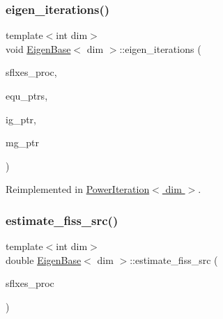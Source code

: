 \mbox{\label{class_eigen_base_ae09830ed4bcb14b7b699cd5f5460fab7}} 
\subsubsection{\texorpdfstring{eigen\+\_\+iterations()}{eigen\_iterations()}}
{\footnotesize\ttfamily template$<$int dim$>$ \\
void \hyperlink{class_eigen_base}{Eigen\+Base}$<$ dim $>$\+::eigen\+\_\+iterations (\begin{DoxyParamCaption}\item[{std\+::vector$<$ Vector$<$ double $>$ $>$ \&}]{sflxes\+\_\+proc,  }\item[{std\+::vector$<$ std\+\_\+cxx11\+::shared\+\_\+ptr$<$ \hyperlink{class_equation_base}{Equation\+Base}$<$ dim $>$ $>$ $>$ \&}]{equ\+\_\+ptrs,  }\item[{std\+\_\+cxx11\+::shared\+\_\+ptr$<$ \hyperlink{class_i_g_base}{I\+G\+Base}$<$ dim $>$ $>$}]{ig\+\_\+ptr,  }\item[{std\+\_\+cxx11\+::shared\+\_\+ptr$<$ \hyperlink{class_m_g_base}{M\+G\+Base}$<$ dim $>$ $>$}]{mg\+\_\+ptr }\end{DoxyParamCaption})\hspace{0.3cm}{\ttfamily [virtual]}}



Reimplemented in \hyperlink{class_power_iteration_a583586002126f8b7a523e95327047cba}{Power\+Iteration$<$ dim $>$}.

\mbox{\label{class_eigen_base_ae733df97cbb04ca2e8a2568acdf9f222}} 
\subsubsection{\texorpdfstring{estimate\+\_\+fiss\+\_\+src()}{estimate\_fiss\_src()}}
{\footnotesize\ttfamily template$<$int dim$>$ \\
double \hyperlink{class_eigen_base}{Eigen\+Base}$<$ dim $>$\+::estimate\+\_\+fiss\+\_\+src (\begin{DoxyParamCaption}\item[{std\+::vector$<$ Vector$<$ double $>$ $>$ \&}]{sflxes\+\_\+proc }\end{DoxyParamCaption})\hspace{0.3cm}{\ttfamily [protected]}}

